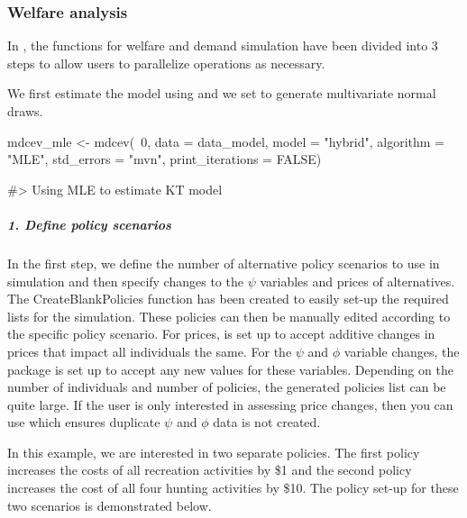 \hypertarget{welfare-analysis}{%
\subsubsection{Welfare analysis}\label{welfare-analysis}}

In , the functions for welfare and demand simulation have
been divided into 3 steps to allow users to parallelize operations as
necessary.

We first estimate the model using  and we set
 to generate multivariate normal draws.

\begin{Schunk}
\begin{Sinput}
mdcev_mle <- mdcev(~0,
                  data = data_model,
                  model = "hybrid",
                  algorithm = "MLE",
                  std_errors = "mvn",
                  print_iterations = FALSE)
\end{Sinput}
\begin{Soutput}
#> Using MLE to estimate KT model
\end{Soutput}
\end{Schunk}

\hypertarget{define-policy-scenarios}{%
\subparagraph{1. Define policy
scenarios}\label{define-policy-scenarios}}

In the first step, we define the number of alternative policy scenarios
to use in simulation and then specify changes to the \(\psi\) variables
and prices of alternatives. The CreateBlankPolicies function has been
created to easily set-up the required lists for the simulation. These
policies can then be manually edited according to the specific policy
scenario. For prices,  is set up to accept additive changes
in prices that impact all individuals the same. For the \(\psi\) and
\(\phi\) variable changes, the package is set up to accept any new
values for these variables. Depending on the number of individuals and
number of policies, the generated policies list can be quite large. If
the user is only interested in assessing price changes, then you can use
 which ensures duplicate \(\psi\) and
\(\phi\) data is not created.

In this example, we are interested in two separate policies. The first
policy increases the costs of all recreation activities by \$1 and the
second policy increases the cost of all four hunting activities by \$10.
The policy set-up for these two scenarios is demonstrated below.

